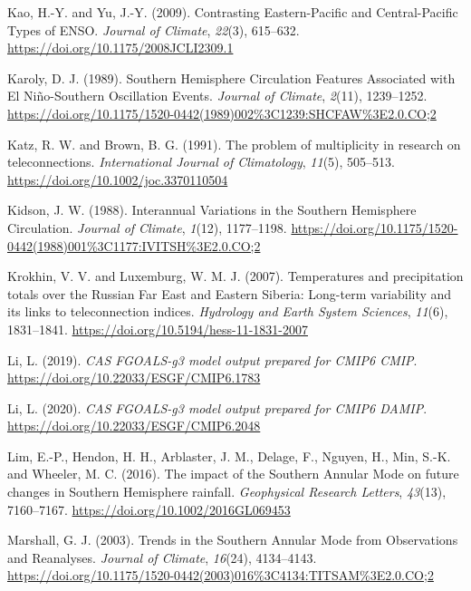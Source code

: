 \documentclass[12pt,oneside,a4paper]{reedthesis}
\newlength{\cslhangindent}
\newenvironment{CSLReferences}[2] %
 {%
  \setlength{\parindent}{0pt}
  \ifodd #1 \everypar{\setlength{\hangindent}{\cslhangindent}}\ignorespaces\fi
  \ifnum #2 > 0
  \setlength{\parskip}{#2\baselineskip}
  \fi
 }%
 {}
\begin{document}
\begin{CSLReferences}{1}{0}
\leavevmode{}%
Kao, H.-Y. and Yu, J.-Y. (2009). Contrasting {Eastern-Pacific} and {Central-Pacific Types} of {ENSO}. \emph{Journal of Climate}, \emph{22}(3), 615--632. \url{https://doi.org/10.1175/2008JCLI2309.1}

\leavevmode{}%
Karoly, D. J. (1989). Southern {Hemisphere Circulation Features Associated} with {El Ni{ñ}o-Southern Oscillation Events}. \emph{Journal of Climate}, \emph{2}(11), 1239--1252. \url{https://doi.org/10.1175/1520-0442(1989)002\%3C1239:SHCFAW\%3E2.0.CO;2}

\leavevmode{}%
Katz, R. W. and Brown, B. G. (1991). The problem of multiplicity in research on teleconnections. \emph{International Journal of Climatology}, \emph{11}(5), 505--513. \url{https://doi.org/10.1002/joc.3370110504}

\leavevmode{}%
Kidson, J. W. (1988). Interannual {Variations} in the {Southern Hemisphere Circulation}. \emph{Journal of Climate}, \emph{1}(12), 1177--1198. \url{https://doi.org/10.1175/1520-0442(1988)001\%3C1177:IVITSH\%3E2.0.CO;2}

\leavevmode{}%
Krokhin, V. V. and Luxemburg, W. M. J. (2007). Temperatures and precipitation totals over the {Russian Far East} and {Eastern Siberia}: Long-term variability and its links to teleconnection indices. \emph{Hydrology and Earth System Sciences}, \emph{11}(6), 1831--1841. \url{https://doi.org/10.5194/hess-11-1831-2007}

\leavevmode{}%
Li, L. (2019). \emph{CAS FGOALS-g3 model output prepared for CMIP6 CMIP}. \url{https://doi.org/10.22033/ESGF/CMIP6.1783}

\leavevmode{}%
Li, L. (2020). \emph{CAS FGOALS-g3 model output prepared for CMIP6 DAMIP}. \url{https://doi.org/10.22033/ESGF/CMIP6.2048}

\leavevmode{}%
Lim, E.-P., Hendon, H. H., Arblaster, J. M., Delage, F., Nguyen, H., Min, S.-K. and Wheeler, M. C. (2016). The impact of the {Southern Annular Mode} on future changes in {Southern Hemisphere} rainfall. \emph{Geophysical Research Letters}, \emph{43}(13), 7160--7167. \url{https://doi.org/10.1002/2016GL069453}

\leavevmode{}%
Marshall, G. J. (2003). Trends in the {Southern Annular Mode} from {Observations} and {Reanalyses}. \emph{Journal of Climate}, \emph{16}(24), 4134--4143. \url{https://doi.org/10.1175/1520-0442(2003)016\%3C4134:TITSAM\%3E2.0.CO;2}


\end{CSLReferences}
\end{document}
